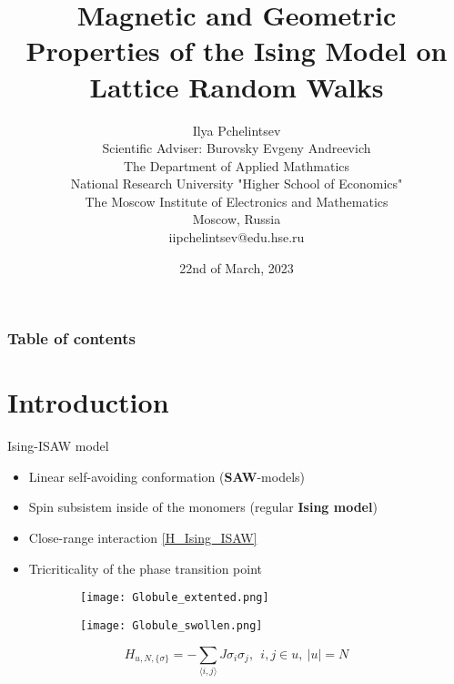 \documentclass{beamer}
\title{Magnetic and Geometric Properties of the Ising Model on Lattice Random Walks}
\author{Ilya Pchelintsev\\
Scientific Adviser: Burovsky Evgeny Andreevich\\
The Department of Applied Mathmatics\\
National Research University "Higher School of Economics"\\
The Moscow Institute of Electronics and Mathematics\\
Moscow, Russia\\
iipchelintsev@edu.hse.ru}
\date{22nd of March, 2023}
\begin{document}
\begin{frame}
\titlepage
\end{frame}

\begin{frame}
\frametitle{Table of contents}
\tableofcontents
\end{frame}

\section{Introduction}

\begin{frame}{Ising-ISAW model}
\begin{itemize}
\item Linear self-avoiding conformation (\textbf{SAW}-models)
\item Spin subsistem inside of the monomers (regular \textbf{Ising model})
\item Close-range interaction \eqref{H_Ising_ISAW}
\item Tricriticality of the phase transition point \cite{Gennes1979}
\end{itemize}

\begin{figure}
\begin{subfigure}{0.35\textwidth}
\centering
\texttt{[image: Globule\_extented.png]}
\end{subfigure}
\hfill
\begin{subfigure}{0.35\textwidth}
\centering
\texttt{[image: Globule\_swollen.png]}
\end{subfigure}
\begin{equation}\label{H_Ising_ISAW}
  H_{u, N, \{\sigma\}} = - \sum_{\langle i,j \rangle} J  \sigma_{i}  \sigma_{j},\ \ i,j \in u,\ |u| = N
\end{equation}
\end{figure}



\end{frame}
\end{document}
